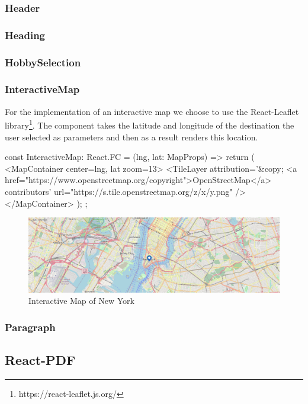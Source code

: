 \documentclass[english,notitlepage,smartquotes]{hgbreport}
\begin{document}
\subsubsection{Header}

\subsubsection{Heading}

\subsubsection{HobbySelection} \label{HobbySelectionComponent}

\subsubsection{InteractiveMap} \label{InteractiveMap}
For the implementation of an interactive map we choose to use the React-Leaflet library\footnote{https://react-leaflet.js.org/}. The component takes the latitude and longitude of the destination the user selected as parameters and then as a result renders this location.
\begin{PythonCode}
	const InteractiveMap: React.FC = ({lng, lat}: MapProps) => {
		return (
		<MapContainer center={{lng, lat}} zoom={13}>
		<TileLayer
		attribution='&copy; <a href="https://www.openstreetmap.org/copyright">OpenStreetMap</a> contributors'
		url="https://{s}.tile.openstreetmap.org/{z}/{x}/{y}.png"
		/>
		</MapContainer>
		);
	};
\end{PythonCode}
\begin{figure}[H]
	\centering
	\includegraphics[width=1\textwidth]{interactiveMap.png}
	\caption{Interactive Map of New York}
	\label{figInteractiveMap}
\end{figure}

\subsubsection{Paragraph}

\subsection{React-PDF} \label{ReactPDF}
\end{document}
